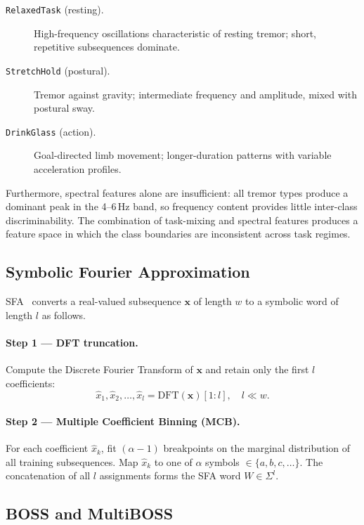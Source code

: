 \documentclass[12pt, a4paper]{article}
\begin{document}
\begin{description}
  \item[\texttt{RelaxedTask} (resting).] High-frequency oscillations
    characteristic of resting tremor; short, repetitive subsequences
    dominate.
  \item[\texttt{StretchHold} (postural).] Tremor against gravity;
    intermediate frequency and amplitude, mixed with postural sway.
  \item[\texttt{DrinkGlass} (action).] Goal-directed limb movement;
    longer-duration patterns with variable acceleration profiles.
\end{description}

\noindent
Furthermore, spectral features alone are insufficient: all tremor types
produce a dominant peak in the 4--6\,Hz band, so frequency content
provides little inter-class discriminability. The combination of
task-mixing and spectral features produces a feature space in which the
class boundaries are inconsistent across task regimes.

\subsection{Symbolic Fourier Approximation}

SFA~\cite{boss} converts a real-valued subsequence $\mathbf{x}$ of
length $w$ to a symbolic word of length $l$ as follows.

\paragraph{Step 1 — DFT truncation.}
Compute the Discrete Fourier Transform of $\mathbf{x}$ and retain only
the first $l$ coefficients:
\begin{equation}
  \hat{x}_1, \hat{x}_2, \ldots, \hat{x}_l = \mathrm{DFT}(\mathbf{x})[1{:}l],
  \quad l \ll w.
  \label{eq:dft}
\end{equation}

\paragraph{Step 2 — Multiple Coefficient Binning (MCB).}
For each coefficient $\hat{x}_k$, fit $(\alpha-1)$ breakpoints on the
marginal distribution of all training subsequences. Map $\hat{x}_k$ to
one of $\alpha$ symbols $\in \{a, b, c, \ldots\}$. The concatenation
of all $l$ assignments forms the SFA word $W \in \Sigma^l$.

\subsection{BOSS and MultiBOSS}
\end{document}
